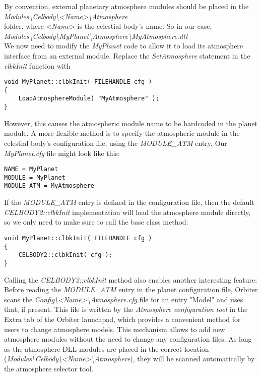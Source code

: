 \documentclass[Orbiter Developer Manual.tex]{subfiles}
\begin{document}
\noindent
By convention, external planetary atmosphere modules should be placed in the\\
\indent \textit{Modules\textbackslash Celbody\textbackslash <Name>\textbackslash Atmosphere}\\
folder, where <\textit{Name}> is the celestial body's name. So in our case,\\
\indent \textit{Modules\textbackslash Celbody\textbackslash MyPlanet\textbackslash Atmosphere\textbackslash MyAtmosphere.dll}\\
We now need to modify the \textit{MyPlanet} code to allow it to load its atmosphere interface from an external module. Replace the \textit{SetAtmosphere} statement in the \textit{clbkInit} function with

\begin{lstlisting}
void MyPlanet::clbkInit( FILEHANDLE cfg )
{
	LoadAtmosphereModule( "MyAtmosphere" );
}
\end{lstlisting}

\noindent
However, this causes the atmospheric module name to be hardcoded in the planet module. A more flexible method is to specify the atmospheric module in the celestial body's configuration file, using the \textit{MODULE\_ATM} entry. Our \textit{MyPlanet.cfg} file might look like this:

\begin{lstlisting}[language=OSFS]
NAME = MyPlanet
MODULE = MyPlanet
MODULE_ATM = MyAtmosphere
\end{lstlisting}

\noindent
If the \textit{MODULE\_ATM} entry is defined in the configuration file, then the default \textit{CELBODY2::clbkInit} implementation will load the atmosphere module directly, so we only need to make sure to call the base class method:

\begin{lstlisting}
void MyPlanet::clbkInit( FILEHANDLE cfg )
{
	CELBODY2::clbkInit( cfg );
}
\end{lstlisting}

\noindent
Calling the \textit{CELBODY2::clbkInit} method also enables another interesting feature: Before reading the \textit{MODULE\_ATM} entry in the planet configuration file, Orbiter scans the \textit{Config\textbackslash <Name>\textbackslash Atmosphere.cfg} file for an entry "Model" and uses that, if present. This file is written by the \textit{Atmosphere configuration tool} in the Extra tab of the Orbiter launchpad, which provides a convenient method for users to change atmosphere models. This mechanism allows to add new atmosphere modules without the need to change any configuration files. As long as the atmosphere DLL modules are placed in the correct location (\textit{Modules\textbackslash Celbody\textbackslash <Name>\textbackslash Atmosphere}), they will be scanned automatically by the atmosphere selector tool.
\end{document}
